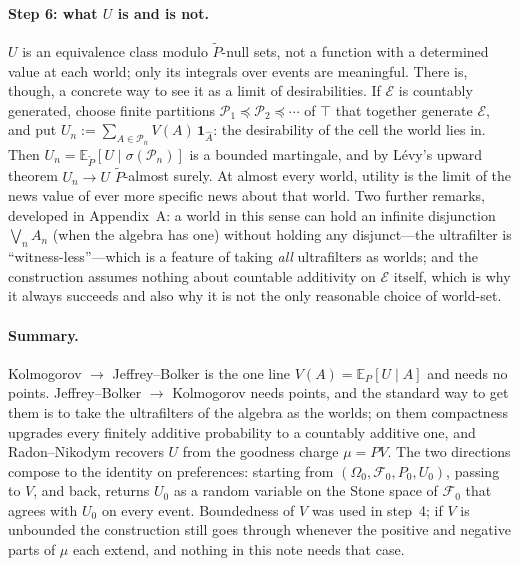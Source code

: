\documentclass[11pt,a4paper]{article}
\newcommand{\E}{\mathbb{E}}
\newcommand{\cE}{\mathcal{E}}
\newcommand{\cF}{\mathcal{F}}
\newcommand{\cP}{\mathcal{P}}
\begin{document}
\paragraph{Step 6: what $U$ is and is not.}
$U$ is an equivalence class modulo $\tilde P$-null sets, not a function with a determined value at each world; only its integrals over events are meaningful. There is, though, a concrete way to see it as a limit of desirabilities. If $\cE$ is countably generated, choose finite partitions $\cP_1 \preceq \cP_2 \preceq \cdots$ of $\top$ that together generate $\cE$, and put $U_n := \sum_{A \in \cP_n} V(A)\,\mathbf 1_{\hat A}$: the desirability of the cell the world lies in. Then $U_n = \E_{\tilde P}[U \mid \sigma(\cP_n)]$ is a bounded martingale, and by L\'evy's upward theorem $U_n \to U$ $\tilde P$-almost surely. At almost every world, utility is the limit of the news value of ever more specific news about that world. Two further remarks, developed in Appendix~A: a world in this sense can hold an infinite disjunction $\bigvee_n A_n$ (when the algebra has one) without holding any disjunct---the ultrafilter is ``witness-less''---which is a feature of taking \emph{all} ultrafilters as worlds; and the construction assumes nothing about countable additivity on $\cE$ itself, which is why it always succeeds and also why it is not the only reasonable choice of world-set.

\paragraph{Summary.}
Kolmogorov $\to$ Jeffrey--Bolker is the one line $V(A) = \E_P[U \mid A]$ and needs no points. Jeffrey--Bolker $\to$ Kolmogorov needs points, and the standard way to get them is to take the ultrafilters of the algebra as the worlds; on them compactness upgrades every finitely additive probability to a countably additive one, and Radon--Nikodym recovers $U$ from the goodness charge $\mu = PV$. The two directions compose to the identity on preferences: starting from $(\Omega_0, \cF_0, P_0, U_0)$, passing to $V$, and back, returns $U_0$ as a random variable on the Stone space of $\cF_0$ that agrees with $U_0$ on every event. Boundedness of $V$ was used in step~4; if $V$ is unbounded the construction still goes through whenever the positive and negative parts of $\mu$ each extend, and nothing in this note needs that case.
\end{document}
